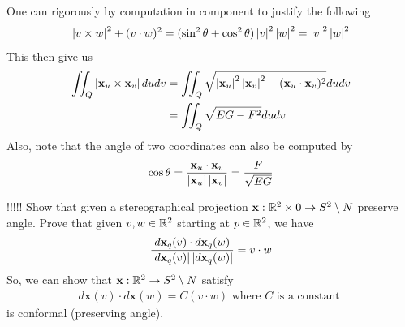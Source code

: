 \documentclass{report}
\begin{document}
\begin{mdframed}
One can rigorously by computation in component to justify the following  
\begin{align*}
\left|v\times w\right|^2 + (v\cdot w)^2= (\sin^2 \theta+ \cos^2 \theta)\left|v\right|^2\left|w\right|^2= \left|v\right|^2\left|w\right|^2
\end{align*}
This then give us 
\begin{align*}
  \iint_Q \left|\textbf{x}_u \times \textbf{x}_v\right|dudv &= \iint_Q \sqrt{ \left|\textbf{x}_u\right|^2\left|\textbf{x}_v\right|^2-(\textbf{x}_u \cdot \textbf{x}_v)^2}  dudv\\
&=\iint_Q \sqrt{EG-F^2}dudv 
\end{align*}
Also, note that the angle of two coordinates can also be computed by 
\begin{align*}
\cos \theta = \frac{\textbf{x}_u \cdot \textbf{x}_v }{\left|\textbf{x}_u\right|\left|\textbf{x}_v\right|}=\frac{F}{\sqrt{EG} }
\end{align*}

\end{mdframed}
\begin{mdframed}
!!!!! Show that given a stereographical projection $\textbf{x}:\mathbb{R}^2 \times 0 \rightarrow S^2\setminus N$ preserve angle. Prove that given $v,w \in\mathbb{R}^2$ starting at $p\in\mathbb{R}^2$, we have 
\begin{align*}
\frac{d\textbf{x}_q(v)\cdot d\textbf{x}_q(w)}{\left|d\textbf{x}_q(v)\right|\left|d\textbf{x}_q(w)\right|}=v\cdot w
\end{align*}
So, we can show that  $\textbf{x}:\mathbb{R}^2 \rightarrow S^2 \setminus N$ satisfy 
\begin{align*}
d\textbf{x}(v)\cdot d\textbf{x}(w)= C (v\cdot w)\text{ where }C\text{ is a constant }
\end{align*}
is conformal (preserving angle). 
\end{mdframed}
\end{document}
